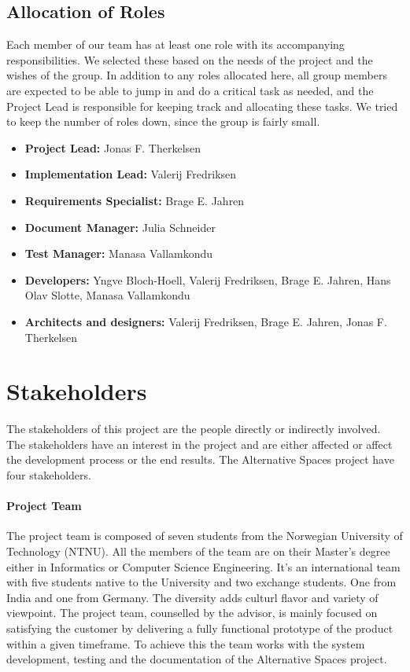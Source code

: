 \subsection{Allocation of Roles}
Each member of our team has at least one role with its accompanying responsibilities. We selected these based on the needs of the project and the wishes of the group. In addition to any roles allocated here, all group members are expected to be able to jump in and do a critical task as needed, and the Project Lead is responsible for keeping track and allocating these tasks. We tried to keep the number of roles down, since the group is fairly small.

\begin{itemize}
\item \textbf{Project Lead: } Jonas F. Therkelsen
\item \textbf{Implementation Lead: } Valerij Fredriksen
\item \textbf{Requirements Specialist: } Brage E. Jahren
\item \textbf{Document Manager: } Julia Schneider
\item \textbf{Test Manager: } Manasa Vallamkondu
\item \textbf{Developers: } Yngve Bloch-Hoell, Valerij Fredriksen, Brage E. Jahren, Hans Olav Slotte, Manasa Vallamkondu
\item \textbf{Architects and designers: } Valerij Fredriksen, Brage E. Jahren, Jonas F. Therkelsen 
\end{itemize}

\section{Stakeholders}

The stakeholders of this project are the people directly or indirectly involved. The stakeholders have an interest in the project and are either affected or affect the development process or the end results. The Alternative Spaces project have four stakeholders. 

\paragraph*{\textbf{Project Team}} 
The project team is composed of seven students from the Norwegian University of Technology (NTNU). All the members of the team are on their Master's degree either in Informatics or Computer Science Engineering. It's an international team with five students native to the University and two exchange students. One from India and one from Germany. The diversity adds culturl flavor and variety of viewpoint. The project team, counselled by the advisor, is mainly focused on satisfying the customer by delivering a fully functional prototype of the product within a given timeframe. To achieve this the team works with the system development, testing and the documentation of the Alternative Spaces project. 
